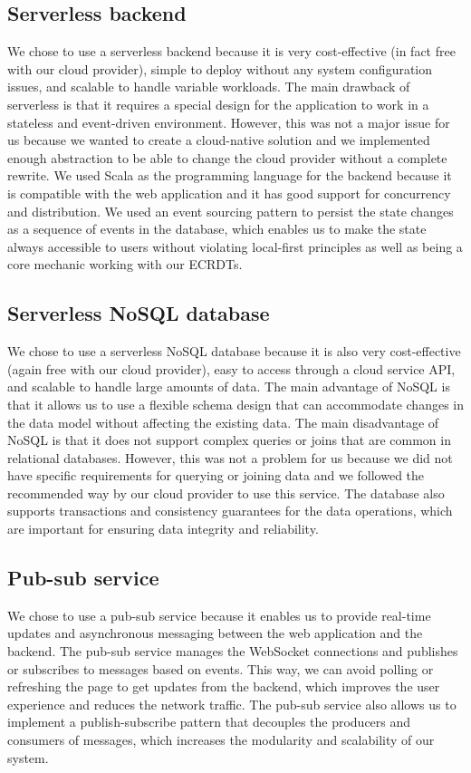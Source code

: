 \documentclass[
	ngerman,
	ruledheaders=section,   %
	class=report,		    %
	thesis={type=bachelor}, %
	accentcolor=9c,			%
	custommargins=true,    %
	marginpar=false,        %
	parskip=half-,          %
	fontsize=11pt,          %
]{tudapub}
\begin{document}
\subsection{Serverless backend} 
We chose to use a serverless backend because it is very cost-effective (in fact free with our cloud provider), simple to deploy without any system configuration issues, and scalable to handle variable workloads. The main drawback of serverless is that it requires a special design for the application to work in a stateless and event-driven environment. However, this was not a major issue for us because we wanted to create a cloud-native solution and we implemented enough abstraction to be able to change the cloud provider without a complete rewrite. We used Scala as the programming language for the backend because it is compatible with the web application and it has good support for concurrency and distribution. We used an event sourcing pattern to persist the state changes as a sequence of events in the database, which enables us to make the state always accessible to users without violating local-first principles as well as being a core mechanic working with our ECRDTs.

\subsection{Serverless NoSQL database} 
We chose to use a serverless NoSQL database because it is also very cost-effective (again free with our cloud provider), easy to access through a cloud service API, and scalable to handle large amounts of data. The main advantage of NoSQL is that it allows us to use a flexible schema design that can accommodate changes in the data model without affecting the existing data. The main disadvantage of NoSQL is that it does not support complex queries or joins that are common in relational databases. However, this was not a problem for us because we did not have specific requirements for querying or joining data and we followed the recommended way by our cloud provider to use this service. The database also supports transactions and consistency guarantees for the data operations, which are important for ensuring data integrity and reliability.

\subsection{Pub-sub service}
We chose to use a pub-sub service because it enables us to provide real-time updates and asynchronous messaging between the web application and the backend. The pub-sub service manages the WebSocket connections and publishes or subscribes to messages based on events. This way, we can avoid polling or refreshing the page to get updates from the backend, which improves the user experience and reduces the network traffic. The pub-sub service also allows us to implement a publish-subscribe pattern that decouples the producers and consumers of messages, which increases the modularity and scalability of our system.
\end{document}
